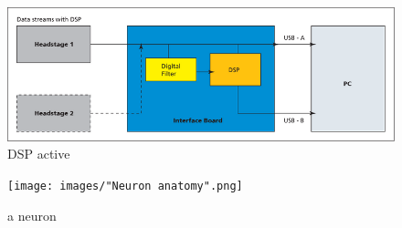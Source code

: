 \begin{figure}[h!]
    \includegraphics[width=\linewidth]{images/dsp_operation.png}
    \caption{DSP active}
    \label{fig:IFB_DSP}
\end{figure}
\begin{figure}[p]
    \centering
    \texttt{[image: images/"Neuron anatomy".png]}
    \caption{a neuron}
    \label{fig:neuron_anatomy}
\end{figure}
